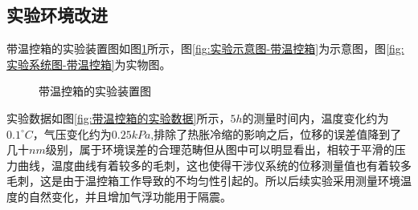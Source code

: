 \subsection{实验环境改进}
带温控箱的实验装置图如图\ref{fig:带温控箱的实验装置图}所示，图\ref{fig:实验示意图-带温控箱}为示意图，图\ref{fig:实验系统图-带温控箱}为实物图。
\begin{figure}[htb]
    \centering
    \caption{带温控箱的实验装置图}
    \label{fig:带温控箱的实验装置图}
  \end{figure}
实验数据如图\ref{fig:带温控箱的实验数据}所示，$5h$的测量时间内，温度变化约为$0.1^\circ C$，气压变化约为$0.25kPa$,排除了热胀冷缩的影响之后，位移的误差值降到了几十$nm$级别，属于环境误差的合理范畴但从图中可以明显看出，相较于平滑的压力曲线，温度曲线有着较多的毛刺，这也使得干涉仪系统的位移测量值也有着较多毛刺，这是由于温控箱工作导致的不均匀性引起的。所以后续实验采用测量环境温度的自然变化，并且增加气浮功能用于隔震。
